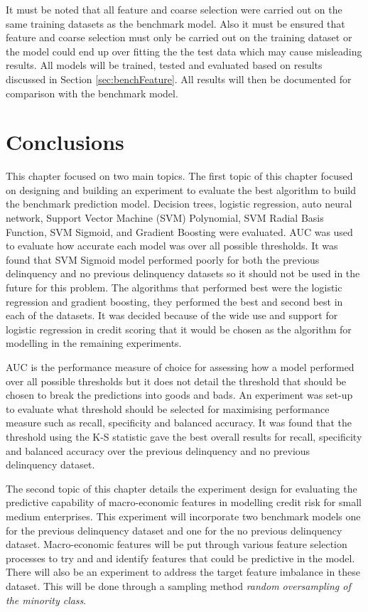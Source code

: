 It must be noted that all feature and coarse selection were carried out on the same training datasets as the benchmark model. Also it must be ensured that feature and coarse selection must only be carried out on the training dataset or the model could end up over fitting the the test data which may cause misleading results. All models will be trained, tested and evaluated based on results discussed in Section \ref{sec:benchFeature}. All results will then be documented for comparison with the benchmark model. 


\section{Conclusions}
This chapter focused on two main topics. The first topic of this chapter focused on designing and building an experiment to evaluate the best algorithm to build the benchmark prediction model. Decision trees, logistic regression, auto neural network, Support Vector Machine (SVM) Polynomial, SVM Radial Basis Function, SVM Sigmoid, and Gradient Boosting were evaluated. AUC was used to evaluate how accurate each model was over all possible thresholds. It was found that SVM Sigmoid model performed poorly for both the previous delinquency and no previous delinquency datasets so it should not be used in the future for this problem. The algorithms that performed best were the logistic regression and gradient boosting, they performed the best and second best in each of the datasets. It was decided because of the wide use and support for logistic regression in credit scoring that it would be chosen as the algorithm for modelling in the remaining experiments. 

AUC is the performance measure of choice for assessing how a model performed over all possible thresholds but it does not detail the threshold that should be chosen to break the predictions into goods and bads. An experiment was set-up to evaluate what threshold should be selected for maximising performance measure such as recall, specificity and balanced accuracy. It was found that the threshold using the K-S statistic gave the best overall results for recall, specificity and balanced accuracy over the previous delinquency and no previous delinquency dataset.

The second topic of this chapter details the experiment design for evaluating the predictive capability of macro-economic features in modelling credit risk for small medium enterprises. This experiment will incorporate two benchmark models one for the previous delinquency dataset and one for the no previous delinquency dataset. Macro-economic features will be put through various feature selection processes to try and and identify features that could be predictive in the model. There will also be an experiment to address the target feature imbalance in these dataset. This will be done through a sampling method \textit{random oversampling of the minority class}.